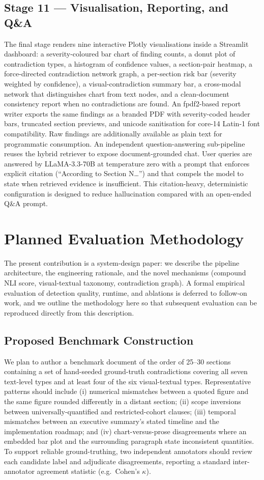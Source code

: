 \documentclass[conference]{IEEEtran}
\begin{document}
\subsection{Stage 11 --- Visualisation, Reporting, and Q\&A}
The final stage renders nine interactive Plotly visualisations inside a Streamlit dashboard: a severity-coloured bar chart of finding counts, a donut plot of contradiction types, a histogram of confidence values, a section-pair heatmap, a force-directed contradiction network graph, a per-section risk bar (severity weighted by confidence), a visual-contradiction summary bar, a cross-modal network that distinguishes chart from text nodes, and a clean-document consistency report when no contradictions are found. An fpdf2-based report writer exports the same findings as a branded PDF with severity-coded header bars, truncated section previews, and unicode sanitisation for core-14 Latin-1 font compatibility. Raw findings are additionally available as plain text for programmatic consumption.
An independent question-answering sub-pipeline reuses the hybrid retriever to expose document-grounded chat. User queries are answered by LLaMA-3.3-70B at temperature zero with a prompt that enforces explicit citation (``According to Section N\ldots'') and that compels the model to state when retrieved evidence is insufficient. This citation-heavy, deterministic configuration is designed to reduce hallucination compared with an open-ended Q\&A prompt.
\section{Planned Evaluation Methodology}\label{sec:eval}
The present contribution is a system-design paper: we describe the pipeline architecture, the engineering rationale, and the novel mechanisms (compound NLI score, visual-textual taxonomy, contradiction graph). A formal empirical evaluation of detection quality, runtime, and ablations is deferred to follow-on work, and we outline the methodology here so that subsequent evaluation can be reproduced directly from this description.
\subsection{Proposed Benchmark Construction}
We plan to author a benchmark document of the order of 25--30 sections containing a set of hand-seeded ground-truth contradictions covering all seven text-level types and at least four of the six visual-textual types. Representative patterns should include (i) numerical mismatches between a quoted figure and the same figure rounded differently in a distant section; (ii) scope inversions between universally-quantified and restricted-cohort clauses; (iii) temporal mismatches between an executive summary's stated timeline and the implementation roadmap; and (iv) chart-versus-prose disagreements where an embedded bar plot and the surrounding paragraph state inconsistent quantities. To support reliable ground-truthing, two independent annotators should review each candidate label and adjudicate disagreements, reporting a standard inter-annotator agreement statistic (e.g.\ Cohen's $\kappa$).
\end{document}
